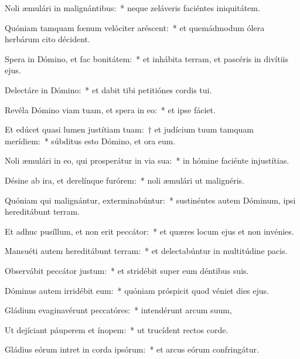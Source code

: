 \item Noli æmulári in malignántibus:~* neque zeláveris faciéntes iniquitátem.

\item Quóniam tamquam fœnum velóciter aréscent:~* et quemádmodum ólera herbárum cito décident.

\item Spera in Dómino, et fac bonitátem:~* et inhábita terram, et pascéris in divítiis ejus.

\item Delectáre in Dómino:~* et dabit tibi petitiónes cordis tui.

\item Revéla Dómino viam tuam, et spera in eo:~* et ipse fáciet.

\item Et edúcet quasi lumen justítiam tuam:~† et judícium tuum tamquam merídiem:~* súbditus esto Dómino, et ora eum.

\item Noli æmulári in eo, qui prosperátur in via sua:~* in hómine faciénte injustítias.

\item Désine ab ira, et derelínque furórem:~* noli æmulári ut malignéris.

\item Quóniam qui malignántur, exterminabúntur:~* sustinéntes autem Dóminum, ipsi hereditábunt terram.

\item Et adhuc pusíllum, et non erit peccátor:~* et quæres locum ejus et non invénies.

\item Mansuéti autem hereditábunt terram:~* et delectabúntur in multitúdine pacis.

\item Observábit peccátor justum:~* et stridébit super eum déntibus suis.

\item Dóminus autem irridébit eum:~* quóniam próspicit quod véniet dies ejus.

\item Gládium evaginavérunt peccatóres:~* intendérunt arcum suum,

\item Ut dejíciant páuperem et ínopem:~* ut trucídent rectos corde.

\item Gládius eórum intret in corda ipsórum:~* et arcus eórum confringátur.
